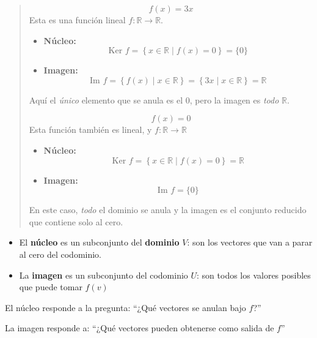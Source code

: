 \begin{quote}
  \[
    f(x) = 3x
  \]
  Esta es una función lineal \(f:\mathbb{R} \rightarrow \mathbb{R}\).
  \begin{itemize}
    \item \textbf{Núcleo:}
    \[
      \text{Ker } f = \left\{x \in \mathbb{R} \mid f(x) = 0\right\} = \{0\}
    \]
    \item \textbf{Imagen:}
    \[
      \text{Im } f = \left\{f(x) \mid x \in \mathbb{R}\right\} = \left\{3x \mid x \in \mathbb{R}\right\} = \mathbb{R}
    \]
  \end{itemize}
  Aquí el \textit{único} elemento que se anula es el \(0\), pero la imagen es \textit{todo} \(\mathbb{R}\).

  \vspace{5mm}

  \[
    f(x) = 0
  \]
  Esta función también es lineal, y \(f:\mathbb{R} \rightarrow \mathbb{R}\)
  \begin{itemize}
    \item \textbf{Núcleo:}
    \[
      \text{Ker } f = \left\{x \in \mathbb{R} \mid f(x) = 0\right\} = \mathbb{R}
    \]
    \item \textbf{Imagen:}
    \[
      \text{Im } f = \{0\}
    \]
  \end{itemize}
  En este caso, \textit{todo} el dominio se anula y la imagen es el conjunto reducido que contiene solo al cero.
\end{quote}

\begin{tcolorbox}[title=Resumen para fijar la idea]
  \begin{itemize}
    \item El \textbf{núcleo} es un subconjunto del \textbf{dominio} \(V\): son los vectores que van a parar al cero del codominio.
    \item La \textbf{imagen} es un subconjunto del codominio \(U\): son todos los valores posibles que puede tomar \(f(v)\)
  \end{itemize}

  \vspace{5mm}

  El núcleo responde a la pregunta: ``¿Qué vectores se anulan bajo \(f\)?''

  La imagen responde a: ``¿Qué vectores pueden obtenerse como salida de \(f\)''
\end{tcolorbox}

